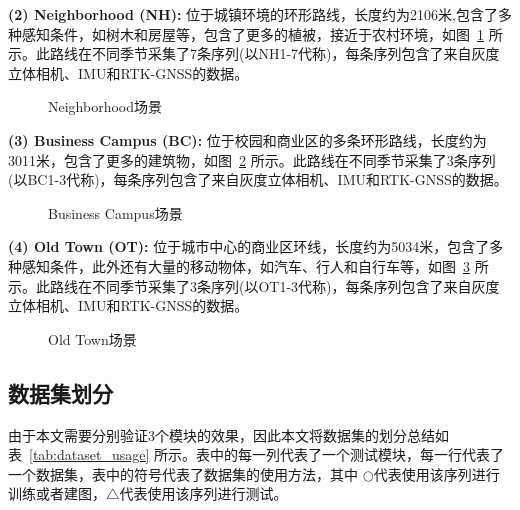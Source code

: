 \textbf{(2) Neighborhood (NH):} 位于城镇环境的环形路线，长度约为2106米,包含了多种感知条件，如树木和房屋等，包含了更多的植被，接近于农村环境，如图~\ref{fig:NH_data} 所示。此路线在不同季节采集了7条序列(以NH1-7代称)，每条序列包含了来自灰度立体相机、IMU和RTK-GNSS的数据。

\begin{figure}
  \centering
  \caption{Neighborhood场景}
  \label{fig:NH_data}
\end{figure}

\textbf{(3) Business Campus (BC):} 位于校园和商业区的多条环形路线，长度约为3011米，包含了更多的建筑物，如图~\ref{fig:BC_data} 所示。此路线在不同季节采集了3条序列(以BC1-3代称)，每条序列包含了来自灰度立体相机、IMU和RTK-GNSS的数据。

\begin{figure}
  \centering
  \caption{Business Campus场景}
  \label{fig:BC_data}
\end{figure}

\textbf{(4) Old Town (OT):} 位于城市中心的商业区环线，长度约为5034米，包含了多种感知条件，此外还有大量的移动物体，如汽车、行人和自行车等，如图~\ref{fig:OT_data} 所示。此路线在不同季节采集了3条序列(以OT1-3代称)，每条序列包含了来自灰度立体相机、IMU和RTK-GNSS的数据。

\begin{figure}
  \centering
  \caption{Old Town场景}
  \label{fig:OT_data}
\end{figure}

\subsection{数据集划分}

由于本文需要分别验证3个模块的效果，因此本文将数据集的划分总结如表~\ref{tab:dataset_usage} 所示。表中的每一列代表了一个测试模块，每一行代表了一个数据集，表中的符号代表了数据集的使用方法，其中{\color[HTML]{3166FF} $\bigcirc$}代表使用该序列进行训练或者建图，{\color[HTML]{FD6864}$\bigtriangleup$}代表使用该序列进行测试。

